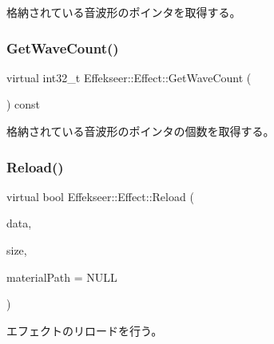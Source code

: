 格納されている音波形のポインタを取得する。 

\mbox{\label{class_effekseer_1_1_effect_af0a2c4cb045d9989619beedd078ff735}} 
\subsubsection{\texorpdfstring{Get\+Wave\+Count()}{GetWaveCount()}}
{\footnotesize\ttfamily virtual int32\+\_\+t Effekseer\+::\+Effect\+::\+Get\+Wave\+Count (\begin{DoxyParamCaption}{ }\end{DoxyParamCaption}) const\hspace{0.3cm}{\ttfamily [pure virtual]}}



格納されている音波形のポインタの個数を取得する。 

\mbox{\label{class_effekseer_1_1_effect_a32c3c8d5a582f7ebaad34b1fb32e6d70}} 
\subsubsection{\texorpdfstring{Reload()}{Reload()}\hspace{0.1cm}{\footnotesize\ttfamily [1/4]}}
{\footnotesize\ttfamily virtual bool Effekseer\+::\+Effect\+::\+Reload (\begin{DoxyParamCaption}\item[{\mbox{\hyperlink{namespace_effekseer_ab34c4088e512200cf4c2716f168deb56}{void}} $\ast$}]{data,  }\item[{int32\+\_\+t}]{size,  }\item[{const \mbox{\hyperlink{_effekseer_8h_a50b026abea014b47854bcd835b3b6233}{E\+F\+K\+\_\+\+C\+H\+AR}} $\ast$}]{material\+Path = {\ttfamily NULL} }\end{DoxyParamCaption})\hspace{0.3cm}{\ttfamily [pure virtual]}}



エフェクトのリロードを行う。 

\mbox{\label{class_effekseer_1_1_effect_acd86f6147154097e727246f7671d99ef}} 
